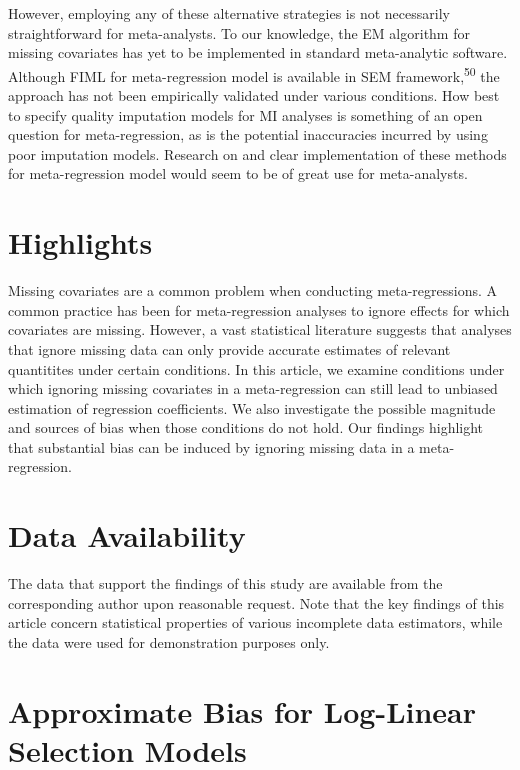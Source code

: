 \documentclass[
]{article}
\begin{document}
However, employing any of these alternative strategies is not necessarily straightforward for meta-analysts.
To our knowledge, the EM algorithm for missing covariates has yet to be implemented in standard meta-analytic software.
Although FIML for meta-regression model is available in SEM framework,\textsuperscript{50} the approach has not been empirically validated under various conditions.
How best to specify quality imputation models for MI analyses is something of an open question for meta-regression, as is the potential inaccuracies incurred by using poor imputation models.
Research on and clear implementation of these methods for meta-regression model would seem to be of great use for meta-analysts.

\clearpage

\hypertarget{highlights}{%
\section{Highlights}\label{highlights}}

Missing covariates are a common problem when conducting meta-regressions.
A common practice has been for meta-regression analyses to ignore effects for which covariates are missing.
However, a vast statistical literature suggests that analyses that ignore missing data can only provide accurate estimates of relevant quantitites under certain conditions.
In this article, we examine conditions under which ignoring missing covariates in a meta-regression can still lead to unbiased estimation of regression coefficients.
We also investigate the possible magnitude and sources of bias when those conditions do not hold.
Our findings highlight that substantial bias can be induced by ignoring missing data in a meta-regression.

\hypertarget{data-availability}{%
\section{Data Availability}\label{data-availability}}

The data that support the findings of this study are available from the corresponding author upon reasonable request. Note that the key findings of this article concern statistical properties of various incomplete data estimators, while the data were used for demonstration purposes only.

\clearpage

\appendix

\hypertarget{approximate-bias-for-log-linear-selection-models-1}{%
\section{Approximate Bias for Log-Linear Selection Models}\label{approximate-bias-for-log-linear-selection-models-1}}
\end{document}
